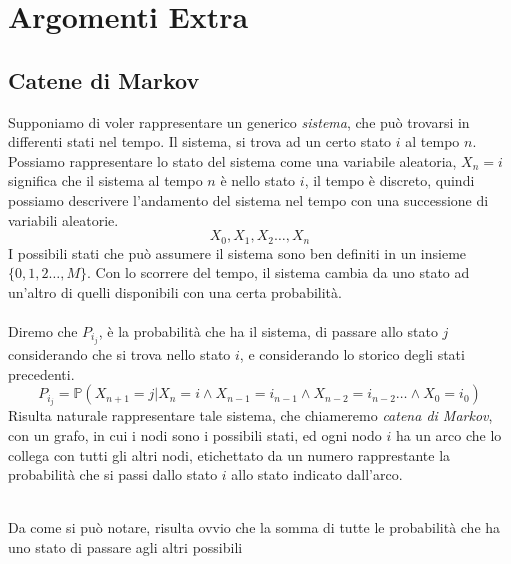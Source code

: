 \documentclass[12pt, letterpaper]{article}
\newcommand{\acc}{\\\hphantom{}\\}
\newcommand{\Prob}{{\mathbb P}}
\begin{document}
\section{Argomenti Extra}
\subsection{Catene di Markov}\label {markov}
Supponiamo di voler rappresentare un generico \textit{sistema}, che può trovarsi in differenti stati nel tempo. Il sistema, 
si trova ad un certo stato \(i\) al tempo \(n\). Possiamo rappresentare lo stato del sistema come una variabile 
aleatoria, \(X_n=i\) significa che il sistema al tempo \(n\) è nello stato \(i\), il tempo è discreto, quindi possiamo 
descrivere l'andamento del sistema nel tempo con una successione di variabili aleatorie.
$$X_0,X_1,X_2\dots,X_n$$
I possibili stati che può assumere il sistema sono ben definiti in un insieme \(\{0,1,2\dots,M\}\). Con lo scorrere 
del tempo, il sistema cambia da uno stato ad un'altro di quelli disponibili con una certa probabilità.\acc 
Diremo che \(P_{i_j}\), è la probabilità che ha il sistema, di passare allo stato \(j\) considerando che si trova nello 
stato \(i\), e considerando lo storico degli stati precedenti.
$$P_{i_j}=\Prob(X_{n+1}=j|X_n=i\land  X_{n-1}=i_{n-1}\land X_{n-2}=i_{n-2}\dots \land X_0=i_0 )$$
Risulta naturale rappresentare tale sistema, che chiameremo \textit{catena di Markov}, con un grafo, 
in cui i nodi sono i possibili stati, ed ogni nodo \(i\) ha un arco che lo collega con tutti gli altri nodi, etichettato 
da un numero rapprestante la probabilità che si passi dallo stato \(i\) allo stato indicato dall'arco.
\begin{figure}[h]
\end{figure}\\
Da come si può notare, risulta ovvio che la somma di tutte le probabilità che ha uno stato di passare agli altri possibili 
\end{document}
